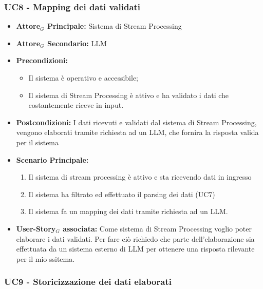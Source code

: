 \documentclass[11pt]{article}
\begin{document}
\begin{justify}

\subsubsection{\textbf{UC8 - Mapping dei dati validati}}

\label{UC8}
\begin{itemize}
    \item \textbf{Attore$_G$ Principale:} Sistema di Stream Processing
    \item \textbf{Attore$_G$ Secondario:} LLM
    \item \textbf{Precondizioni:} 
        \begin{itemize}
          \item Il sistema è operativo e accessibile;
            \item Il sistema di Stream Processing è attivo e ha validato i dati che costantemente riceve in input.
        \end{itemize}
      \item \textbf{Postcondizioni:} I dati ricevuti e validati dal sistema di Stream Processing, vengono elaborati tramite richiesta ad un LLM, che fornira la risposta valida per il sistema\\
    \item \textbf{Scenario Principale:} 
        \begin{enumerate}
        \item Il sistema di stream processing è attivo e sta ricevendo dati in ingresso
        \item Il sistema ha filtrato ed effettuato il parsing dei dati (UC7)
        \item Il sistema fa un mapping dei dati tramite richiesta ad un LLM.
        \end{enumerate}
    \item \textbf{User-Story$_G$ associata:} Come sistema di Stream Processing voglio poter elaborare i dati validati. Per fare ciò richiedo che parte dell'elaborazione sia effettuata da un sistema esterno di LLM per ottenere una risposta rilevante per il mio ssitema.
\end{itemize}


\subsubsection{\textbf{UC9 - Storicizzazione dei dati elaborati}}


\end{justify}
\end{document}
